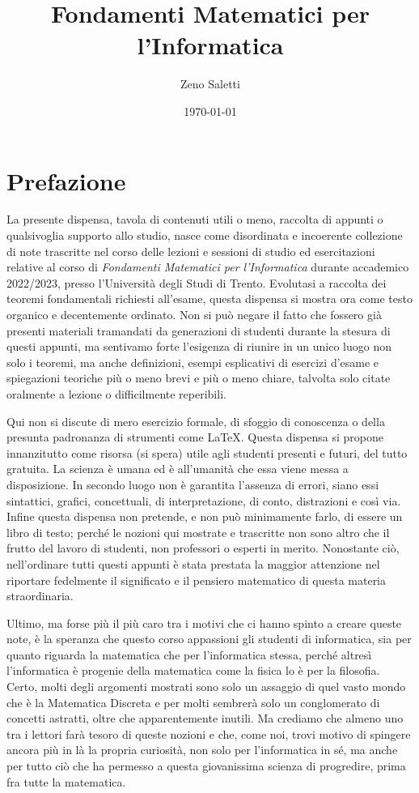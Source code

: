 \documentclass[oneside]{book}
\title{Fondamenti Matematici per l'Informatica}
\author{Zeno Saletti}
\date{\today}
\theoremstyle{remark}
\begin{document}
\begin{titlepage}
\maketitle
\end{titlepage}

\chapter*{Prefazione}
La presente dispensa, tavola di contenuti utili o meno, raccolta
di appunti o qualsivoglia supporto allo studio, nasce come disordinata
e incoerente collezione di note trascritte nel corso delle lezioni e
sessioni di studio ed esercitazioni relative al corso di \textit{Fondamenti
Matematici per l'Informatica} durante accademico 2022/2023,
presso l'Università degli Studi di Trento.
Evolutasi a raccolta dei teoremi fondamentali richiesti all'esame,
questa dispensa si mostra ora come testo organico e decentemente ordinato. Non si può
negare il fatto che fossero già presenti materiali tramandati da
generazioni di studenti durante la stesura di questi appunti, ma
sentivamo forte l'esigenza di riunire in un unico luogo non solo i
teoremi, ma anche definizioni, esempi esplicativi di esercizi
d'esame e spiegazioni teoriche più o meno brevi e più o meno chiare,
talvolta solo citate oralmente a lezione o difficilmente reperibili.

Qui non si discute di mero esercizio formale, di sfoggio di
conoscenza o della presunta padronanza di strumenti come \LaTeX.
Questa dispensa si propone innanzitutto come risorsa (si spera)
utile agli studenti presenti e futuri, del tutto gratuita. La scienza è umana
ed è all'umanità che essa viene messa a disposizione. In secondo luogo
non è garantita l'assenza di errori, siano essi sintattici, grafici, concettuali,
di interpretazione, di conto, distrazioni e così via. Infine questa dispensa non pretende,
e non può minimamente farlo, di essere un libro di testo; perché le nozioni
qui mostrate e trascritte non sono altro che il frutto del lavoro
di studenti, non professori o esperti in merito. Nonostante ciò,
nell'ordinare tutti questi appunti è stata prestata la maggior
attenzione nel riportare fedelmente il significato e il pensiero
matematico di questa materia straordinaria.

Ultimo, ma forse più il più caro tra i motivi che ci hanno spinto
a creare queste note, è la speranza che questo corso appassioni
gli studenti di informatica, sia per quanto riguarda la matematica
che per l'informatica stessa, perché altresì l'informatica è progenie
della matematica come la fisica lo è per la filosofia. Certo, molti
degli argomenti mostrati sono solo un assaggio di quel vasto mondo
che è la Matematica Discreta e per molti sembrerà solo un conglomerato
di concetti astratti, oltre che apparentemente inutili. Ma crediamo che
almeno uno tra i lettori farà tesoro di queste nozioni e che, come noi,
trovi motivo di spingere ancora più in là la propria curiosità,
non solo per l'informatica in sé, ma anche per tutto ciò che ha permesso
a questa giovanissima scienza di progredire, prima fra tutte la matematica.
\end{document}
